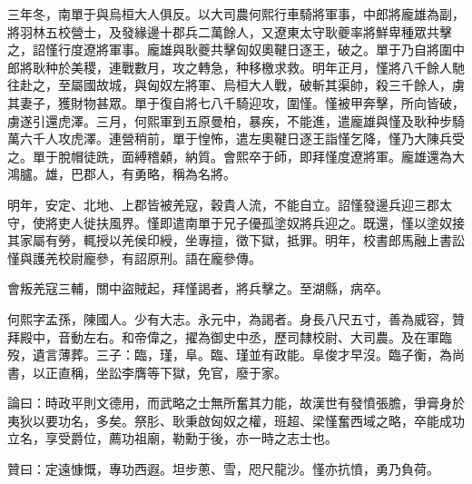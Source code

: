 \begin{pinyinscope}
三年冬，南單于與烏桓大人俱反。以大司農何熙行車騎將軍事，中郎將龐雄為副，將羽林五校營士，及發緣邊十郡兵二萬餘人，又遼東太守耿夔率將鮮卑種眾共擊之，詔慬行度遼將軍事。龐雄與耿夔共擊匈奴奧鞬日逐王，破之。單于乃自將圍中郎將耿种於美稷，連戰數月，攻之轉急，种移檄求救。明年正月，慬將八千餘人馳往赴之，至屬國故城，與匈奴左將軍、烏桓大人戰，破斬其渠帥，殺三千餘人，虜其妻子，獲財物甚眾。單于復自將七八千騎迎攻，圍慬。慬被甲奔擊，所向皆破，虜遂引還虎澤。三月，何熙軍到五原曼柏，暴疾，不能進，遣龐雄與慬及耿种步騎萬六千人攻虎澤。連營稍前，單于惶怖，遣左奧鞬日逐王詣慬乞降，慬乃大陳兵受之。單于脫帽徒跣，面縛稽顙，納質。會熙卒于師，即拜慬度遼將軍。龐雄還為大鴻臚。雄，巴郡人，有勇略，稱為名將。

明年，安定、北地、上郡皆被羌寇，穀貴人流，不能自立。詔慬發邊兵迎三郡太守，使將吏人徙扶風界。慬即遣南單于兄子優孤塗奴將兵迎之。既還，慬以塗奴接其家屬有勞，輒授以羌侯印綬，坐專擅，徵下獄，抵罪。明年，校書郎馬融上書訟慬與護羌校尉龐參，有詔原刑。語在龐參傳。

會叛羌寇三輔，關中盜賊起，拜慬謁者，將兵擊之。至湖縣，病卒。

何熙字孟孫，陳國人。少有大志。永元中，為謁者。身長八尺五寸，善為威容，贊拜殿中，音動左右。和帝偉之，擢為御史中丞，歷司隸校尉、大司農。及在軍臨歿，遺言薄葬。三子：臨，瑾，阜。臨、瑾並有政能。阜俊才早沒。臨子衡，為尚書，以正直稱，坐訟李膺等下獄，免官，廢于家。

論曰：時政平則文德用，而武略之士無所奮其力能，故漢世有發憤張膽，爭膏身於夷狄以要功名，多矣。祭肜、耿秉啟匈奴之權，班超、梁慬奮西域之略，卒能成功立名，享受爵位，薦功祖廟，勒勳于後，亦一時之志士也。

贊曰：定遠慷慨，專功西遐。坦步蔥、雪，咫尺龍沙。慬亦抗憤，勇乃負荷。


\end{pinyinscope}